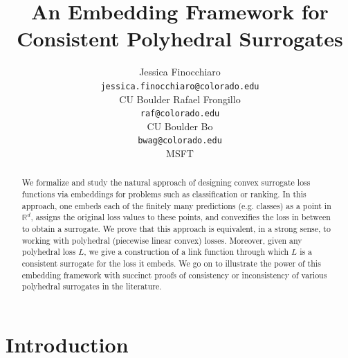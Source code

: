 \documentclass[12pt]{article}
\title{An Embedding Framework for Consistent Polyhedral Surrogates}
\author{%
 Jessica Finocchiaro\raf{Jessie?} \\
 \texttt{jessica.finocchiaro@colorado.edu}\\
 CU Boulder
 \And
 Rafael Frongillo\\
 \texttt{raf@colorado.edu}\\
 CU Boulder
 \And
 Bo\\
 \texttt{bwag@colorado.edu}\\
 MSFT
}
\newcommand{\Comments}{1}
\newcommand{\mynote}[2]{\ifnum\Comments=1\textcolor{#1}{#2}\fi}
\newcommand{\raf}[1]{\mynote{green}{[RF: #1]}}
\newcommand{\reals}{\mathbb{R}}
\begin{document}
\maketitle

\begin{abstract}
We formalize and study the natural approach of designing convex surrogate loss functions via embeddings for problems such as classification or ranking. In this approach, one embeds each of the finitely many predictions (e.g. classes) as a point in $\reals^d$, assigns the original loss values to these points, and convexifies the loss in between to obtain a surrogate.
We prove that this approach is equivalent, in a strong sense, to working with polyhedral (piecewise linear convex) losses.
Moreover, given any polyhedral loss $L$, we give a construction of a link function through which $L$ is a consistent surrogate for the loss it embeds.
We go on to illustrate the power of this embedding framework with succinct proofs of consistency or inconsistency of various polyhedral surrogates in the literature.
\end{abstract}



\section{Introduction}\label{sec:intro}
\end{document}
